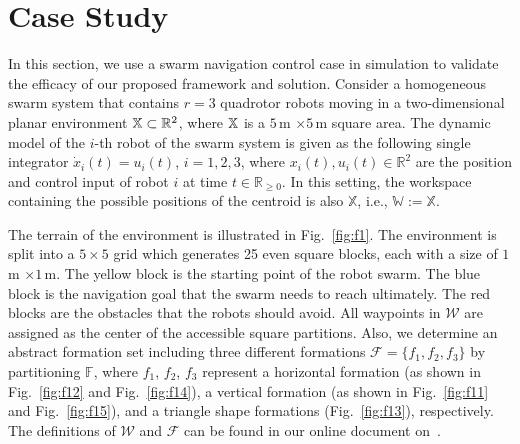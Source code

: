 \documentclass[letterpaper, 10 pt, conference]{ieeeconf}
\newtheorem{theorem}{Theorem}
\begin{document}









\section{Case Study}\label{sec:cas}

In this section, we use a swarm navigation control case in simulation to validate the efficacy of our proposed framework and solution. Consider a homogeneous swarm system that contains $r=3$ quadrotor robots moving in a two-dimensional planar environment $\mathbb{X} \subset \mathbb{R}^2$, where $\mathbb{X}$ is a $5\,$m $\times5\,$m square area. The dynamic model of the $i$-th robot of the swarm system is given as the following single integrator $\dot{x}_i(t) = u_i(t)$, $i=1,2,3$, where $x_i(t), u_i(t) \in \mathbb{R}^2$ are the position and control input of robot $i$ at time $t \in \mathbb{R}_{\geq 0}$. In this setting, the workspace containing the possible positions of the centroid is also $\mathbb{X}$, i.e., $\mathbb{W}:=\mathbb{X}$.

The terrain of the environment is illustrated in Fig.~\ref{fig:f1}. The environment is split into a $5\times 5$ grid which generates 25 even square blocks, each with a size of $1\,$m $\times 1\,$m. The yellow block is the starting point of the robot swarm. The blue block is the navigation goal that the swarm needs to reach ultimately. The red blocks are the obstacles that the robots should avoid. All waypoints in $\mathcal{W}$ are assigned as the center of the accessible square partitions. Also, we determine an abstract formation set including three different formations $\mathcal{F}=\{f_1, f_2, f_3\}$ by partitioning $\mathbb F$, where $f_1$, $f_2$, $f_3$ represent a horizontal formation (as shown in Fig.~\ref{fig:f12} and Fig.~\ref{fig:f14}), a vertical formation (as shown in Fig.~\ref{fig:f11} and Fig.~\ref{fig:f15}), and a triangle shape formations (Fig.~\ref{fig:f13}), respectively. The definitions of $\mathcal{W}$ and $\mathcal{F}$ can be found in our online document on~\cite{ourCode}.
\end{document}
